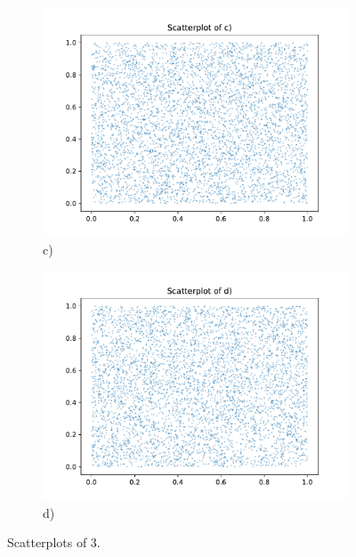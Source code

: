 \begin{figure}
\begin{subfigure}[b]{0.5\textwidth}
          \includegraphics[width=\textwidth]{images/c2d.pdf}
          \caption{c)}
        \end{subfigure}
        \begin{subfigure}[b]{0.5\textwidth}
          \includegraphics[width=\textwidth]{images/d2d.pdf}
          \caption{d)}
        \end{subfigure}
        \caption{Scatterplots of 3.}
        \label{fig:3}
      \end{figure}


